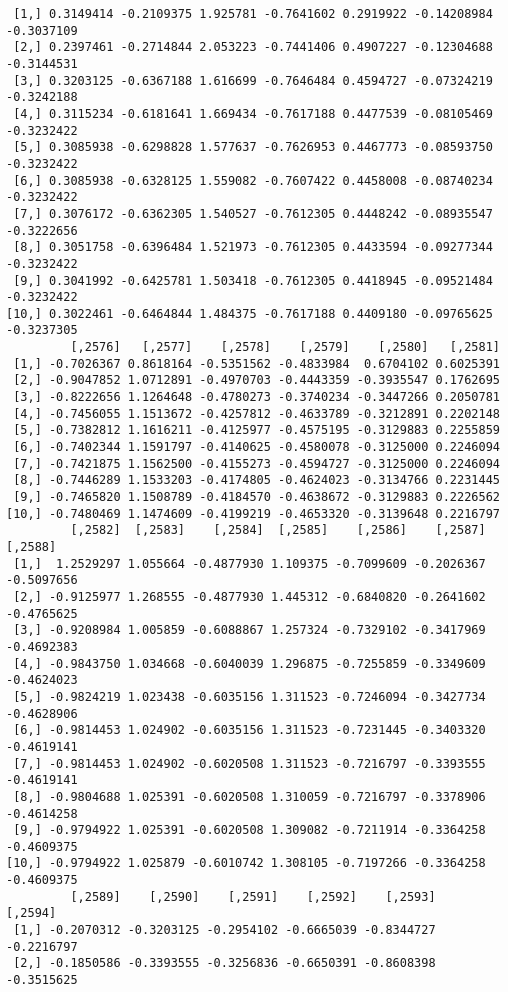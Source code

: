 \documentclass[
  letterpaper,
  DIV=11,
  numbers=noendperiod]{scrreprt}
\begin{document}
\begin{verbatim}
 [1,] 0.3149414 -0.2109375 1.925781 -0.7641602 0.2919922 -0.14208984 -0.3037109
 [2,] 0.2397461 -0.2714844 2.053223 -0.7441406 0.4907227 -0.12304688 -0.3144531
 [3,] 0.3203125 -0.6367188 1.616699 -0.7646484 0.4594727 -0.07324219 -0.3242188
 [4,] 0.3115234 -0.6181641 1.669434 -0.7617188 0.4477539 -0.08105469 -0.3232422
 [5,] 0.3085938 -0.6298828 1.577637 -0.7626953 0.4467773 -0.08593750 -0.3232422
 [6,] 0.3085938 -0.6328125 1.559082 -0.7607422 0.4458008 -0.08740234 -0.3232422
 [7,] 0.3076172 -0.6362305 1.540527 -0.7612305 0.4448242 -0.08935547 -0.3222656
 [8,] 0.3051758 -0.6396484 1.521973 -0.7612305 0.4433594 -0.09277344 -0.3232422
 [9,] 0.3041992 -0.6425781 1.503418 -0.7612305 0.4418945 -0.09521484 -0.3232422
[10,] 0.3022461 -0.6464844 1.484375 -0.7617188 0.4409180 -0.09765625 -0.3237305
         [,2576]   [,2577]    [,2578]    [,2579]    [,2580]   [,2581]
 [1,] -0.7026367 0.8618164 -0.5351562 -0.4833984  0.6704102 0.6025391
 [2,] -0.9047852 1.0712891 -0.4970703 -0.4443359 -0.3935547 0.1762695
 [3,] -0.8222656 1.1264648 -0.4780273 -0.3740234 -0.3447266 0.2050781
 [4,] -0.7456055 1.1513672 -0.4257812 -0.4633789 -0.3212891 0.2202148
 [5,] -0.7382812 1.1616211 -0.4125977 -0.4575195 -0.3129883 0.2255859
 [6,] -0.7402344 1.1591797 -0.4140625 -0.4580078 -0.3125000 0.2246094
 [7,] -0.7421875 1.1562500 -0.4155273 -0.4594727 -0.3125000 0.2246094
 [8,] -0.7446289 1.1533203 -0.4174805 -0.4624023 -0.3134766 0.2231445
 [9,] -0.7465820 1.1508789 -0.4184570 -0.4638672 -0.3129883 0.2226562
[10,] -0.7480469 1.1474609 -0.4199219 -0.4653320 -0.3139648 0.2216797
         [,2582]  [,2583]    [,2584]  [,2585]    [,2586]    [,2587]    [,2588]
 [1,]  1.2529297 1.055664 -0.4877930 1.109375 -0.7099609 -0.2026367 -0.5097656
 [2,] -0.9125977 1.268555 -0.4877930 1.445312 -0.6840820 -0.2641602 -0.4765625
 [3,] -0.9208984 1.005859 -0.6088867 1.257324 -0.7329102 -0.3417969 -0.4692383
 [4,] -0.9843750 1.034668 -0.6040039 1.296875 -0.7255859 -0.3349609 -0.4624023
 [5,] -0.9824219 1.023438 -0.6035156 1.311523 -0.7246094 -0.3427734 -0.4628906
 [6,] -0.9814453 1.024902 -0.6035156 1.311523 -0.7231445 -0.3403320 -0.4619141
 [7,] -0.9814453 1.024902 -0.6020508 1.311523 -0.7216797 -0.3393555 -0.4619141
 [8,] -0.9804688 1.025391 -0.6020508 1.310059 -0.7216797 -0.3378906 -0.4614258
 [9,] -0.9794922 1.025391 -0.6020508 1.309082 -0.7211914 -0.3364258 -0.4609375
[10,] -0.9794922 1.025879 -0.6010742 1.308105 -0.7197266 -0.3364258 -0.4609375
         [,2589]    [,2590]    [,2591]    [,2592]    [,2593]    [,2594]
 [1,] -0.2070312 -0.3203125 -0.2954102 -0.6665039 -0.8344727 -0.2216797
 [2,] -0.1850586 -0.3393555 -0.3256836 -0.6650391 -0.8608398 -0.3515625

\end{verbatim}
\end{document}
